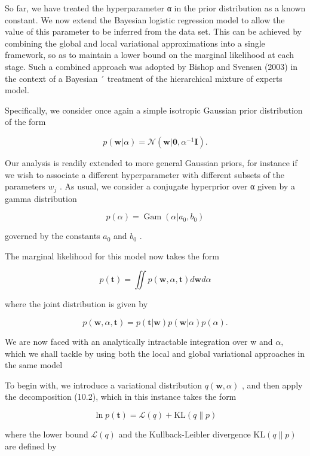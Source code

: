 \documentclass[
  10
]{article}
\begin{document}
So far, we have treated the hyperparameter α in the prior distribution
as a known constant. We now extend the Bayesian logistic regression
model to allow the value of this parameter to be inferred from the data
set. This can be achieved by combining the global and local variational
approximations into a single framework, so as to maintain a lower bound
on the marginal likelihood at each stage. Such a combined approach was
adopted by Bishop and Svensen (2003) in the context of a Bayesian ´
treatment of the hierarchical mixture of experts model.

Specifically, we consider once again a simple isotropic Gaussian prior
distribution of the form

\[
p (\mathbf {w} | \alpha) = \mathcal {N} (\mathbf {w} | \mathbf {0}, \alpha^ {- 1} \mathbf {I}).\tag{10.165}
\]

Our analysis is readily extended to more general Gaussian priors, for
instance if we wish to associate a different hyperparameter with
different subsets of the parameters \(w _ { j }\) . As usual, we
consider a conjugate hyperprior over α given by a gamma distribution

\[
p (\alpha) = \operatorname{Gam} (\alpha | a _ {0}, b _ {0})\tag{10.166}
\]

governed by the constants \(a _ { 0 }\) and \(b _ { 0 }\) .

The marginal likelihood for this model now takes the form

\[
p (\mathbf {t}) = \iint p (\mathbf {w}, \alpha , \mathbf {t}) d \mathbf {w} d \alpha\tag{10.167}
\]

where the joint distribution is given by

\[
p (\mathbf {w}, \alpha , \mathbf {t}) = p (\mathbf {t} | \mathbf {w}) p (\mathbf {w} | \alpha) p (\alpha).\tag{10.168}
\]

We are now faced with an analytically intractable integration over w and
\(\alpha ,\) which we shall tackle by using both the local and global
variational approaches in the same model

To begin with, we introduce a variational distribution
\(q ( \mathbf { w } , \alpha )\) , and then apply the decomposition
(10.2), which in this instance takes the form

\[
\ln p (\mathbf {t}) = \mathcal {L} (q) + \mathrm{KL} (q \| p)\tag{10.169}
\]

where the lower bound \(\mathcal { L } ( q )\) and the Kullback-Leibler
divergence \(\mathrm { K L } ( q \| p )\) are defined by
\end{document}
